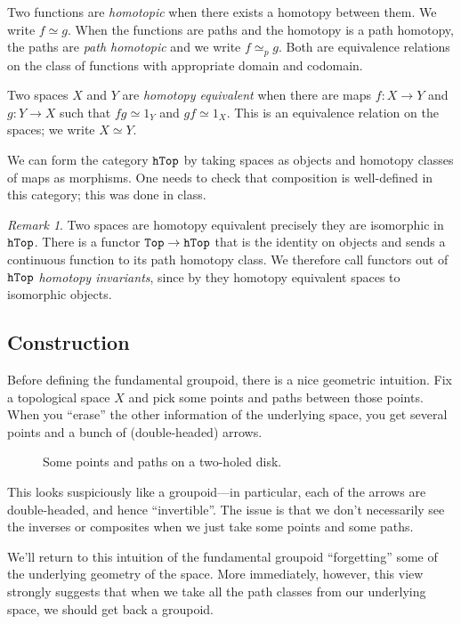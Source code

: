 \documentclass[11 pt]{amsart}
\theoremstyle{plain}   %
\theoremstyle{definition}
\theoremstyle{remark}
\newtheorem{rem}{Remark}[section]
\numberwithin{equation}{section}
\newcommand{\cat}[1]{{\normalfont\texttt{#1}}}
\begin{document}
Two functions are \emph{homotopic} when there exists a homotopy between them. We
write $f\simeq g$. When the functions are paths and the homotopy is a path
homotopy, the paths are \emph{path homotopic} and we write $f\simeq_p g$. Both
are equivalence relations on the class of functions with appropriate domain and
codomain.

Two spaces $X$ and $Y$ are \emph{homotopy equivalent} when there are maps $f:
	X\rightarrow Y$ and $g: Y\rightarrow X$ such that $fg\simeq 1_Y$ and $gf\simeq
	1_X$. This is an equivalence relation on the spaces; we write $X\simeq Y$.

We can form the category $\cat{hTop}$ by taking spaces as objects and homotopy
classes of maps as morphisms. One needs to check that composition is
well-defined in this category; this was done in class.

\begin{rem} Two spaces are homotopy equivalent precisely they are isomorphic in
	$\cat{hTop}$. There is a functor $\cat{Top}\rightarrow\cat{hTop}$ that is the
	identity on objects and sends a continuous function to its path homotopy
	class. We therefore call functors out of $\cat{hTop}$ \emph{homotopy
		invariants}, since by  they homotopy
	equivalent spaces to isomorphic objects. \end{rem}

\subsection{Construction}

Before defining the fundamental groupoid, there is a nice geometric intuition. Fix
a topological space $X$ and pick some points and paths between those points.
When you ``erase'' the other information of the underlying space, you get
several points and a bunch of (double-headed) arrows.

\begin{figure}[H]
	\centering
	
	\caption{Some points and paths on a two-holed disk.}
	\label{fig:group}
\end{figure}

This looks suspiciously like a groupoid---in particular, each of the arrows are
double-headed, and hence ``invertible''. The issue is that we don't necessarily
see the inverses or composites when we just take some points and some paths.

We'll return to this intuition of the fundamental groupoid ``forgetting'' some of
the underlying geometry of the space. More immediately, however, this view
strongly suggests that when we take all the path classes from our underlying space,
we should get back a groupoid.
\end{document}
